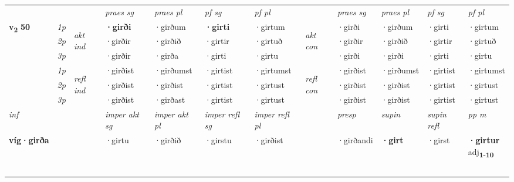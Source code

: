 \begin{longtable}[l]{X>{\footnotesize\itshape}llXXXXlXXXX}
 & &   & \textit{praes sg}  & \textit{praes pl}    & \textit{ pf sg} & \textit{pf pl} & & \textit{praes sg}  & \textit{praes pl}    & \textit{pf sg} & \textit{pf pl }  \\ \cmidrule{4-7} \cmidrule{9-12}
 \multirow{2}{*}{{{\textbf{v{\textsubscript{2}}} \Large{\textbf{50}}}}}  & 1p & \multirow{3}{*}{\begin{turn}{90}\textit{akt ind}\end{turn}} & \textbf{·girði} & ·girðum & \textbf{·girti} & ·girtum & \multirow{3}{*}{\begin{turn}{90}\textit{akt con}\end{turn}} &·girði & ·girðum & ·girti & ·girtum\\*
 & 2p &  &  ·girðir  & ·girðið & ·girtir & ·girtuð & & ·girðir & ·girðið & ·girtir & ·girtuð \\*
 & 3p &  & ·girðir & ·girða & ·girti & ·girtu & & ·girði & ·girði& ·girti & ·girtu \\*
\cmidrule{4-7} \cmidrule{9-12}
 & 1p & \multirow{3}{*}{\begin{turn}{90}\textit{refl ind}\end{turn}}  & ·girðist & ·girðumst & ·girtist & ·girtumst & \multirow{3}{*}{\begin{turn}{90}\textit{refl con}\end{turn}}  &·girðist & ·girðumst & ·girtist & ·girtumst \\*
 & 2p &  & ·girðist & ·girðist & ·girtist & ·girtust & &·girðist & ·girðist & ·girtist & ·girtust \\*
 & 3p  & & ·girðist & ·girðast & ·girtist & ·girtust & & ·girðist & ·girðist& ·girtist & ·girtust \\*
\cmidrule{4-7} \cmidrule{9-12}

   {\textit{inf}} & &  & \textit{imper akt sg} & \textit{imper akt pl} & \textit{imper refl sg} & \textit{imper refl pl} && \textit{presp} & \textit{supin} & \textit{supin refl} & \textit{pp m} \\*
  {\textbf{víg\allowbreak ·girða}} & && ·girtu  & ·girðið & ·girstu & ·girðist && ·girðandi &  \textbf{·girt} & ·girst & \specialcell{\textbf{·girtur} \\ adj\textbf{\textsubscript{1-10}}} \\*

\midrule
 & \\*
   & \\*
   & \\*
   & \\*
  & \\
   \midrule


\end{longtable}
